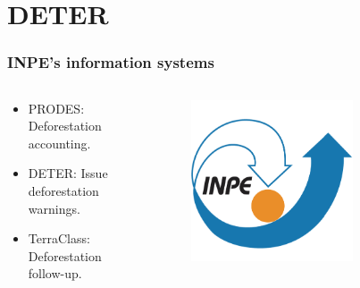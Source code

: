 \documentclass[aspectratio=169]{beamer}
\begin{document}
\section{DETER}


\begin{frame}
  \frametitle{INPE's information systems}
  \begin{columns}
    \begin{column}{0.4\textwidth}
      \begin{itemize}
        \item PRODES: Deforestation accounting.
        \item DETER: Issue deforestation warnings.
        \item TerraClass: Deforestation follow-up.
      \end{itemize}
    \end{column}
    \begin{column}{0.6\textwidth}
      \begin{figure}
        \centering
        \includegraphics[width=0.7\textwidth]{logos/Inpelogo.png}
      \end{figure}
    \end{column}
  \end{columns}
\end{frame}
\end{document}

